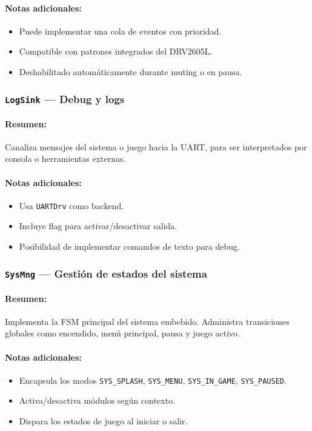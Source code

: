 \documentclass[11pt,a4paper]{article}
\begin{document}
\paragraph{Notas adicionales:}
\begin{itemize}
  \item Puede implementar una cola de eventos con prioridad.
  \item Compatible con patrones integrados del DRV2605L.
  \item Deshabilitado automáticamente durante muting o en pausa.
\end{itemize}

\subsubsection{\texttt{LogSink} — Debug y logs}
\paragraph{Resumen:} Canaliza mensajes del sistema o juego hacia la UART, para ser interpretados por consola o herramientas externas.
\paragraph{Notas adicionales:}
\begin{itemize}
  \item Usa \texttt{UARTDrv} como backend.
  \item Incluye flag para activar/desactivar salida.
  \item Posibilidad de implementar comandos de texto para debug.
\end{itemize}

\subsubsection{\texttt{SysMng} — Gestión de estados del sistema}
\paragraph{Resumen:} Implementa la FSM principal del sistema embebido. Administra transiciones globales como encendido, menú principal, pausa y juego activo.
\paragraph{Notas adicionales:}
\begin{itemize}
  \item Encapsula los modos \texttt{SYS\_SPLASH}, \texttt{SYS\_MENU}, \texttt{SYS\_IN\_GAME}, \texttt{SYS\_PAUSED}.
  \item Activa/desactiva módulos según contexto.
  \item Dispara los estados de juego al iniciar o salir.
\end{itemize}
\end{document}
